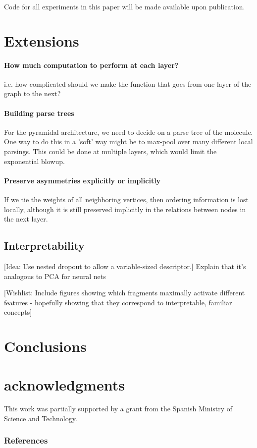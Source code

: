 \documentclass{article}
\begin{document}
Code for all experiments in this paper will be made available upon publication.



\section{Extensions}

\paragraph{How much computation to perform at each layer?}
i.e. how complicated should we make the function that goes from one layer of the graph to the next?

\paragraph{Building parse trees}
For the pyramidal architecture, we need to decide on a parse tree of the molecule.
One way to do this in a 'soft' way might be to max-pool over many different local parsings.
This could be done at multiple layers, which would limit the exponential blowup.

\paragraph{Preserve asymmetries explicitly or implicitly}
If we tie the weights of all neighboring vertices, then ordering information is lost locally, although it is still preserved implicitly in the relations between nodes in the next layer.

\subsection{Interpretability}
[Idea: Use nested dropout to allow a variable-sized descriptor.]
Explain that it's analogous to PCA for neural nets

[Wishlist: Include figures showing which fragments maximally activate different features - hopefully showing that they correspond to interpretable, familiar concepts]

\section{Conclusions}


\section*{acknowledgments}
This work was partially supported by a grant from the Spanish Ministry of Science and Technology.



\subsubsection*{References}



\end{document}
